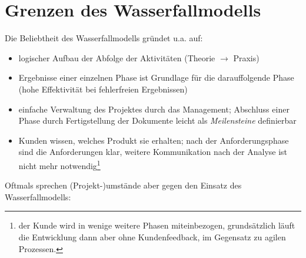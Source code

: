 \section{Grenzen des Wasserfallmodells}\label{sec:grenzen-des-wasserfallmodells}

\noindent
Die Beliebtheit des Wasserfallmodells gründet u.a. auf:

\begin{itemize}
    \item logischer Aufbau der Abfolge der Aktivitäten (Theorie $\rightarrow$ Praxis)
    \item Ergebnisse einer einzelnen Phase ist Grundlage für die darauffolgende Phase (hohe Effektivität bei fehlerfreien Ergebnissen)
    \item einfache Verwaltung des Projektes durch das Management; Abschluss einer Phase durch Fertigstellung der Dokumente leicht als \textit{Meilensteine} definierbar
    \item Kunden wissen, welches Produkt sie erhalten; nach der Anforderungsphase sind die Anforderungen klar, weitere Kommunikation nach der Analyse ist nicht mehr notwendig\footnote{
    der Kunde wird in wenige weitere Phasen miteinbezogen, grundsätzlich läuft die Entwicklung dann aber ohne Kundenfeedback, im Gegensatz zu agilen Prozessen.
    }
\end{itemize}

\noindent
Oftmals sprechen (Projekt-)umstände aber gegen den Einsatz des Wasserfallmodells:

